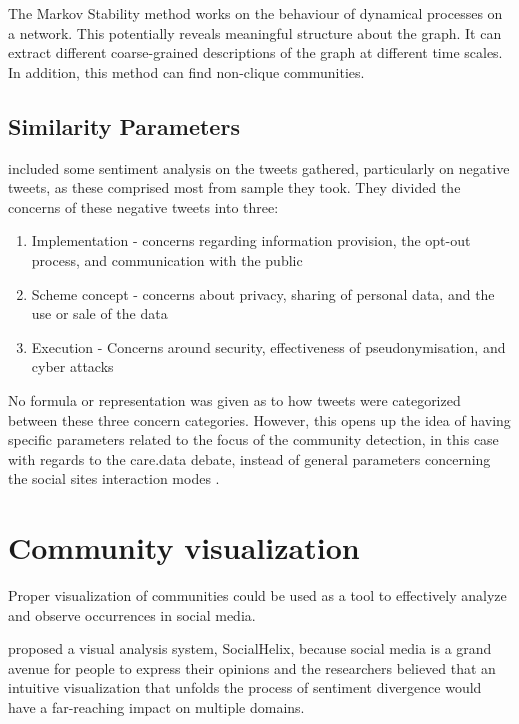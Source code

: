 The Markov Stability method works on the behaviour of dynamical processes on a network. This potentially reveals meaningful structure about the graph. It can extract different coarse-grained descriptions of the graph at different time scales. In addition, this method can find non-clique communities.


\subsection{Similarity Parameters}


 included some sentiment analysis on the tweets gathered, particularly on negative tweets, as these comprised most from sample they took. They divided the concerns of these negative tweets into three:


\begin{enumerate}
	\item Implementation - concerns regarding information provision, the opt-out process, and communication with the public
	\item Scheme concept - concerns about privacy, sharing of personal data, and the use or sale of the data
	\item Execution - Concerns around security, effectiveness of pseudonymisation, and cyber attacks
	
\end{enumerate}


No formula or representation was given as to how tweets were categorized between these three concern categories. However, this opens up the idea of having specific parameters related to the focus of the community detection, in this case with regards to the care.data debate, instead of general parameters concerning the social site\vtick s interaction modes \cite{Amor:2015}.


\section{Community visualization}


Proper visualization of communities could be used as a tool to effectively analyze and observe occurrences in social media.


 proposed a visual analysis system, SocialHelix, because social media is a grand avenue for people to express their opinions and the researchers believed that an intuitive visualization that unfolds the process of sentiment divergence would have a far-reaching impact on multiple domains. 


